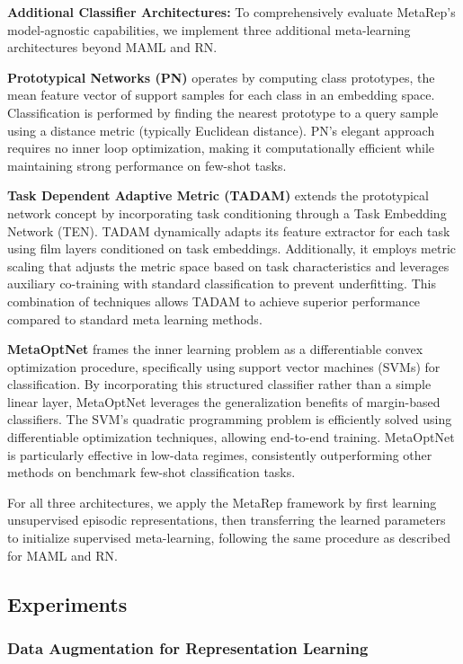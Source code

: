 \textbf{Additional Classifier Architectures:} To comprehensively evaluate MetaRep's model-agnostic capabilities, we implement three additional meta-learning architectures beyond MAML and RN.

\textbf{Prototypical Networks (PN)} \cite{snell2017prototypical} operates by computing class prototypes, the mean feature vector of support samples for each class in an embedding space. Classification is performed by finding the nearest prototype to a query sample using a distance metric (typically Euclidean distance). PN's elegant approach requires no inner loop optimization, making it computationally efficient while maintaining strong performance on few-shot tasks.

\textbf{Task Dependent Adaptive Metric (TADAM)} \cite{oreshkin2018tadam} extends the prototypical network concept by incorporating task conditioning through a Task Embedding Network (TEN). TADAM dynamically adapts its feature extractor for each task using film layers conditioned on task embeddings. Additionally, it employs metric scaling that adjusts the metric space based on task characteristics and leverages auxiliary co-training with standard classification to prevent underfitting. This combination of techniques allows TADAM to achieve superior performance compared to standard meta learning methods.

\textbf{MetaOptNet} \cite{lee2019metaoptnet} frames the inner learning problem as a differentiable convex optimization procedure, specifically using support vector machines (SVMs) for classification. By incorporating this structured classifier rather than a simple linear layer, MetaOptNet leverages the generalization benefits of margin-based classifiers. The SVM's quadratic programming problem is efficiently solved using differentiable optimization techniques, allowing end-to-end training. MetaOptNet is particularly effective in low-data regimes, consistently outperforming other methods on benchmark few-shot classification tasks.

For all three architectures, we apply the MetaRep framework by first learning unsupervised episodic representations, then transferring the learned parameters to initialize supervised meta-learning, following the same procedure as described for MAML and RN.

\subsection{Experiments}

\subsubsection{Data Augmentation for Representation Learning}

